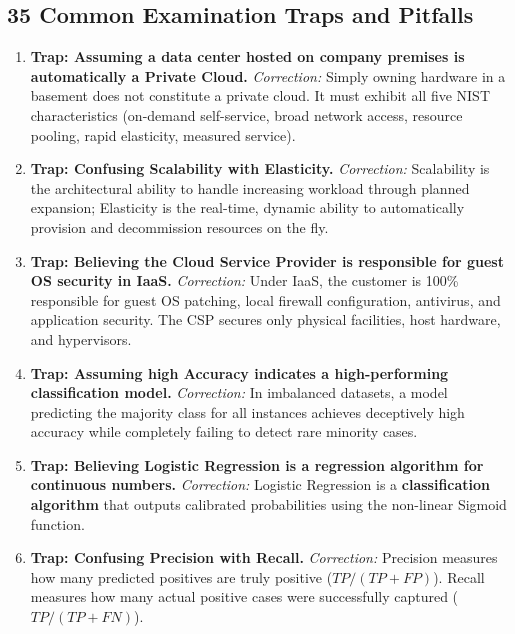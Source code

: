 \subsection*{35 Common Examination Traps and Pitfalls}
\begin{enumerate}[label=\arabic*.,leftmargin=2em]
    \item \textbf{Trap: Assuming a data center hosted on company premises is automatically a Private Cloud.}
    \textit{Correction:} Simply owning hardware in a basement does not constitute a private cloud. It must exhibit all five NIST characteristics (on-demand self-service, broad network access, resource pooling, rapid elasticity, measured service).

    \item \textbf{Trap: Confusing Scalability with Elasticity.}
    \textit{Correction:} Scalability is the architectural ability to handle increasing workload through planned expansion; Elasticity is the real-time, dynamic ability to automatically provision and decommission resources on the fly.

    \item \textbf{Trap: Believing the Cloud Service Provider is responsible for guest OS security in IaaS.}
    \textit{Correction:} Under IaaS, the customer is 100\% responsible for guest OS patching, local firewall configuration, antivirus, and application security. The CSP secures only physical facilities, host hardware, and hypervisors.

    \item \textbf{Trap: Assuming high Accuracy indicates a high-performing classification model.}
    \textit{Correction:} In imbalanced datasets, a model predicting the majority class for all instances achieves deceptively high accuracy while completely failing to detect rare minority cases.

    \item \textbf{Trap: Believing Logistic Regression is a regression algorithm for continuous numbers.}
    \textit{Correction:} Logistic Regression is a \textbf{classification algorithm} that outputs calibrated probabilities using the non-linear Sigmoid function.

    \item \textbf{Trap: Confusing Precision with Recall.}
    \textit{Correction:} Precision measures how many predicted positives are truly positive ($TP/(TP+FP)$). Recall measures how many actual positive cases were successfully captured ($TP/(TP+FN)$).


\end{enumerate}
